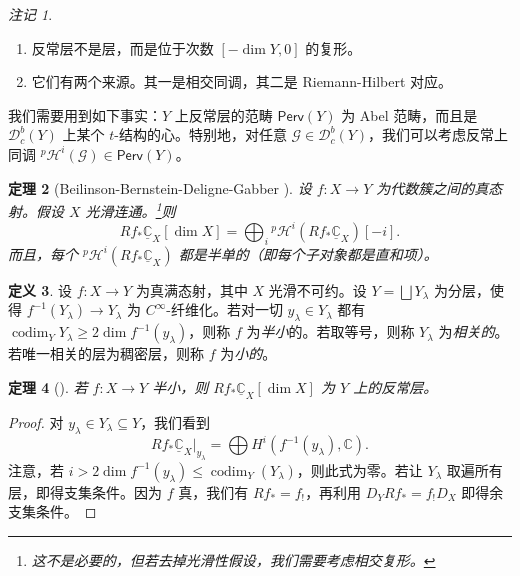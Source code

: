 \documentclass{amsart}
\newtheorem{thm}{定理}[section]
\theoremstyle{definition}
\newtheorem{defn}[thm]{定义}
\theoremstyle{remark}
\newtheorem{rmks}[thm]{注记}
\theoremstyle{plain}
\theoremstyle{definition}
\theoremstyle{remark}
\newcommand{\C}{\mathbb{C}}
\newcommand{\mc}[1]{\mathcal{#1}}
\newcommand{\on}[1]{\operatorname{#1}}
\newcommand{\ms}[1]{\mathsf{#1}}
\newcommand{\ul}[1]{\underline{#1}}
\newcommand{\1}{\mathbf{1}}
\newcommand{\2}{\mathbf{2}}
\newcommand{\3}{\mathbf{3}}
\begin{document}
\begin{rmks}\leavevmode
    \begin{enumerate}
        \item 反常层不是层，而是位于次数 \([-\dim Y, 0]\) 的复形。
        \item 它们有两个来源。其一是相交同调，其二是 Riemann-Hilbert 对应。
    \end{enumerate}
\end{rmks}

我们需要用到如下事实：\(Y\) 上反常层的范畴 \(\ms{Perv}(Y)\) 为 Abel 范畴，而且是 \(\mc{D}_c^b(Y)\) 上某个 \(t\)-结构的心。特别地，对任意 \(\mc{G} \in \mc{D}_c^b (Y)\)，我们可以考虑反常上同调 \(^p\mc{H}^i(\mc{G}) \in \ms{Perv}(Y)\)。

\begin{thm}[Beilinson-Bernstein-Deligne-Gabber {\cite{BBD1982}}]
    设 \(f \colon X \to Y\) 为代数簇之间的真态射。假设 \(X\) 光滑连通。\footnote{这不是必要的，但若去掉光滑性假设，我们需要考虑相交复形。}则
    \[ R f_* \ul{\C}_X [\dim X] = \bigoplus_{i} {^p\mc{H}^i}(R f_* \ul{\C}_X)[-i]. \]
    而且，每个 \(^p\mc{H}^i (R f_* \ul{\C}_X)\) 都是半单的（即每个子对象都是直和项）。
\end{thm}

\begin{defn}
    设 \(f \colon X \to Y\) 为真满态射，其中 \(X\) 光滑不可约。设 \(Y = \bigsqcup Y_{\lambda}\) 为分层，使得 \(f^{-1}(Y_{\lambda}) \to Y_{\lambda}\) 为 \(C^{\infty}\)-纤维化。若对一切 \(y_{\lambda} \in Y_{\lambda}\) 都有 \(\on{codim}_Y Y_{\lambda} \geq 2 \dim f^{-1} (y_{\lambda})\)，则称 \(f\) 为\textit{半小}的。若取等号，则称 \(Y_{\lambda}\) 为\textit{相关的}。若唯一相关的层为稠密层，则称 \(f\) 为\textit{小的}。
\end{defn}

\begin{thm}[{\cite{DeCataldoMigliorini2002}}]
    若 \(f \colon X \to Y\) 半小，则 \(R f_* \ul{\C}_X [\dim X]\) 为 \(Y\) 上的反常层。
\end{thm}

\begin{proof}
    对 \(y_{\lambda} \in Y_{\lambda} \subseteq Y\)，我们看到
    \[ R f_* \ul{\C}_X |_{y_{\lambda}} = \bigoplus H^i (f^{-1}(y_{\lambda}), \C). \]
    注意，若 \(i > 2 \dim f^{-1}(y_{\lambda}) \leq \on{codim}_Y (Y_{\lambda})\)，则此式为零。若让 \(Y_{\lambda}\) 取遍所有层，即得支集条件。因为 \(f\) 真，我们有 \(R f_* = f_!\)，再利用 \(D_Y R f_* = f_! D_X\) 即得余支集条件。
\end{proof}
\end{document}
